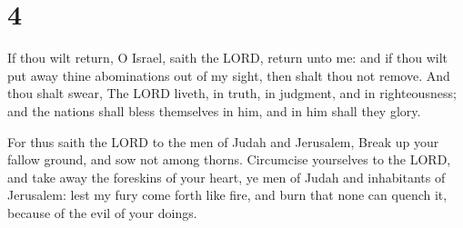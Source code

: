 \hypertarget{section-3}{%
\section{4}\label{section-3}}

 If thou wilt return, O Israel, saith the LORD, return
unto me: and if thou wilt put away thine abominations out of my sight,
then shalt thou not remove.  And thou shalt swear, The
LORD liveth, in truth, in judgment, and in righteousness; and the
nations shall bless themselves in him, and in him shall they glory.

 For thus saith the LORD to the men of Judah and
Jerusalem, Break up your fallow ground, and sow not among thorns.
 Circumcise yourselves to the LORD, and take away the
foreskins of your heart, ye men of Judah and inhabitants of Jerusalem:
lest my fury come forth like fire, and burn that none can quench it,
because of the evil of your doings.

